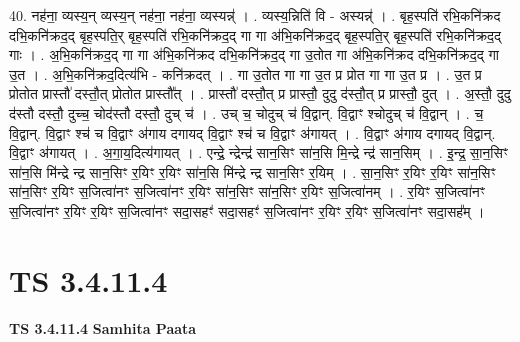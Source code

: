 \documentclass[17pt]{extarticle}
\begin{document}
40. नह॑ना॒ व्यस्य॒न् व्यस्य॒न् नह॑ना॒ नह॑ना॒ व्यस्यन्न्॑ । . व्यस्य॒न्निति॑ वि - अस्यन्न्॑ । . बृह॒स्पति॑ रभि॒कनि॑क्रद दभि॒कनि॑क्रद॒द् बृह॒स्पति॒र् बृह॒स्पति॑ रभि॒कनि॑क्रद॒द् गा गा अ॑भि॒कनि॑क्रद॒द् 
बृह॒स्पति॒र् बृह॒स्पति॑ रभि॒कनि॑क्रद॒द् गाः । . अ॒भि॒कनि॑क्रद॒द् गा गा अ॑भि॒कनि॑क्रद दभि॒कनि॑क्रद॒द् गा उ॒तोत गा अ॑भि॒कनि॑क्रद दभि॒कनि॑क्रद॒द् गा उ॒त । . अ॒भि॒कनि॑क्रद॒दित्य॑भि - कनि॑क्रदत् । . गा उ॒तोत गा गा उ॒त प्र प्रोत गा गा उ॒त प्र । . उ॒त प्र प्रोतोत प्रास्तौ॑ दस्तौ॒त् प्रोतोत प्रास्तौ᳚त् । . प्रास्तौ॑ दस्तौ॒त् प्र प्रास्तौ॒ दुदु द॑स्तौ॒त् प्र प्रास्तौ॒ दुत् । . अ॒स्तौ॒ दुदु द॑स्तौ दस्तौ॒ दुच्च॒ चोद॑स्तौ दस्तौ॒ दुच् च॑ । . उच् च॒ चोदुच् च॑ वि॒द्वान्. वि॒द्वाꣳ श्चोदुच् च॑ वि॒द्वान् । . च॒ वि॒द्वान्. वि॒द्वाꣳ श्च॑ च वि॒द्वाꣳ अ॑गाय दगायद् वि॒द्वाꣳ श्च॑ च वि॒द्वाꣳ अ॑गायत् । . वि॒द्वाꣳ अ॑गाय दगायद् वि॒द्वान्. वि॒द्वाꣳ अ॑गायत् । . अ॒गा॒य॒दित्य॑गायत् । . एन्द्रे॒ न्द्रेन्द्र॑ सान॒सिꣳ सा॑न॒सि मि॒न्द्रे न्द्र॑ सान॒सिम् । . इ॒न्द्र॒ सा॒न॒सिꣳ सा॑न॒सि मि॑न्द्रे न्द्र सान॒सिꣳ र॒यिꣳ र॒यिꣳ सा॑न॒सि मि॑न्द्रे न्द्र सान॒सिꣳ र॒यिम् । . सा॒न॒सिꣳ र॒यिꣳ र॒यिꣳ सा॑न॒सिꣳ सा॑न॒सिꣳ र॒यिꣳ स॒जित्वा॑नꣳ स॒जित्वा॑नꣳ र॒यिꣳ सा॑न॒सिꣳ सा॑न॒सिꣳ र॒यिꣳ स॒जित्वा॑नम् । . र॒यिꣳ स॒जित्वा॑नꣳ स॒जित्वा॑नꣳ र॒यिꣳ र॒यिꣳ स॒जित्वा॑नꣳ सदा॒सहꣳ॑ सदा॒सहꣳ॑ स॒जित्वा॑नꣳ र॒यिꣳ र॒यिꣳ स॒जित्वा॑नꣳ सदा॒सह᳚म् । \newline
\pagebreak
{}

\section{ TS 3.4.11.4 }

\textbf{TS 3.4.11.4 } \newline
\textbf{Samhita Paata} \newline
\end{document}
